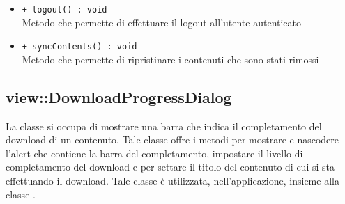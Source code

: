 \documentclass[../Tesi.tex]{subfiles}
\begin{document}
\begin{description}
\begin{itemize}
				\item \texttt{+ logout() : void}\\
				Metodo che permette di effettuare il logout all'utente autenticato

				\item \texttt{+ syncContents() : void}\\
				Metodo che permette di ripristinare i contenuti che sono stati rimossi
			\end{itemize}
		\end{description}

		\subsection{view::DownloadProgressDialog}
		La classe  si occupa di mostrare una barra che indica il completamento del download di un contenuto. Tale classe offre i metodi per mostrare e nascodere l'alert che contiene la barra del completamento, impostare il livello di completamento del download e per settare il titolo del contenuto di cui si sta effettuando il download. Tale classe è utilizzata, nell'applicazione, insieme alla classe .
\end{document}
